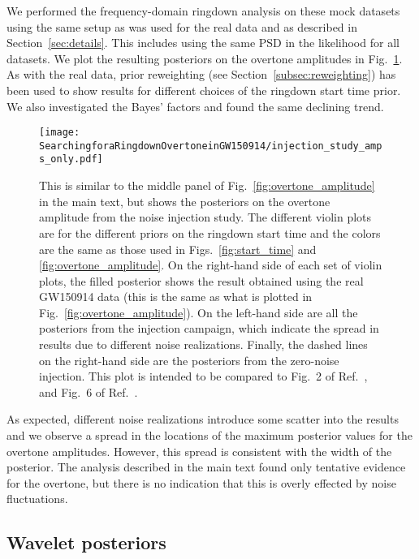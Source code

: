 We performed the frequency-domain ringdown analysis on these mock datasets using the same setup as was used for the real data and as described in Section~\ref{sec:details}.
This includes using the same PSD in the likelihood for all datasets.
We plot the resulting posteriors on the overtone amplitudes in Fig.~\ref{fig:injection_study}.
As with the real data, prior reweighting (see Section~\ref{subsec:reweighting}) has been used to show results for different choices of the ringdown start time prior.
We also investigated the Bayes' factors and found the same declining trend.

\begin{figure}[t]
    \centering
    \texttt{[image: SearchingforaRingdownOvertoneinGW150914/injection\_study\_amps\_only.pdf]}
    \caption[Posteriors on the overtone amplitude from a noise injection study]{ 
    This is similar to the middle panel of Fig.~\ref{fig:overtone_amplitude} in the main text, but shows the posteriors on the overtone amplitude from the noise injection study.
    The different violin plots are for the different priors on the ringdown start time and the colors are the same as those used in Figs.~\ref{fig:start_time} and \ref{fig:overtone_amplitude}.
    On the right-hand side of each set of violin plots, the filled posterior shows the result obtained using the real GW150914 data (this is the same as what is plotted in Fig.~\ref{fig:overtone_amplitude}). 
    On the left-hand side are all the posteriors from the injection campaign, which indicate the spread in results due to different noise realizations.  
    Finally, the dashed lines on the right-hand side are the posteriors from the zero-noise injection.
    This plot is intended to be compared to Fig.~2 of Ref.~\cite{Cotesta:2022pci}, and Fig.~6 of Ref.~\cite{Isi:2022mhy}.
    }
    \label{fig:injection_study}
\end{figure}

As expected, different noise realizations introduce some scatter into the results and we observe a spread in the locations of the maximum posterior values for the overtone amplitudes. 
However, this spread is consistent with the width of the posterior. 
The analysis described in the main text found only tentative evidence for the overtone, but there is no indication that this is overly effected by noise fluctuations.


\subsection{Wavelet posteriors}\label{app:W3}

